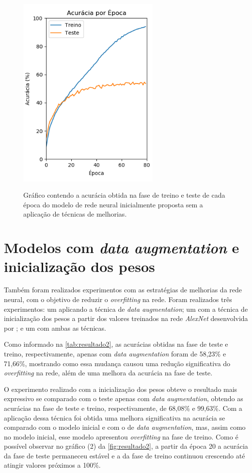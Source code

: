 % 

\begin{figure}[H]
  \centering
  \caption{Gráfico contendo a acurácia obtida na fase de treino e teste de cada época do modelo de rede neural inicialmente proposta sem a aplicação de técnicas de melhorias.}
  \includegraphics[width=200pt]{dados/figuras/resultado1}
  \label{fig:resultado1}
\end{figure}

\section{Modelos com \textit{data augmentation} e inicialização dos pesos}
Também foram realizados experimentos com as estratégias de melhorias da rede neural, com o objetivo de reduzir o \textit{overfitting} na rede. Foram realizados três experimentos: um aplicando a técnica de \textit{data augmentation}; um com a técnica de inicialização dos pesos a partir dos valores treinados na rede \textit{AlexNet} desenvolvida por ; e um com ambas as técnicas. 

\par Como informado na \autoref{tab:resultado2}, as acurácias obtidas na fase de teste e treino, respectivamente, apenas com \textit{data augmentation} foram de 58,23\% e 71,66\%, mostrando como essa mudança causou uma redução significativa do \textit{overfitting} na rede, além de uma melhora da acurácia na fase de teste.



\par O experimento realizado com a inicialização dos pesos obteve o resultado mais expressivo se comparado com o teste apenas com \textit{data augmentation}, obtendo as acurácias na fase de teste e treino, respectivamente, de 68,08\% e 99,63\%. Com a aplicação dessa técnica foi obtida uma melhora significativa na acurácia se comparado com o modelo inicial e com o de \textit{data augmentation}, mas, assim como no modelo inicial, esse modelo apresentou \textit{overfitting} na fase de treino. Como é possível observar no gráfico (2) da \autoref{fig:resultado2}, a partir da época 20 a acurácia da fase de teste permaneceu estável e a da fase de treino continuou crescendo até atingir valores próximos a 100\%.


